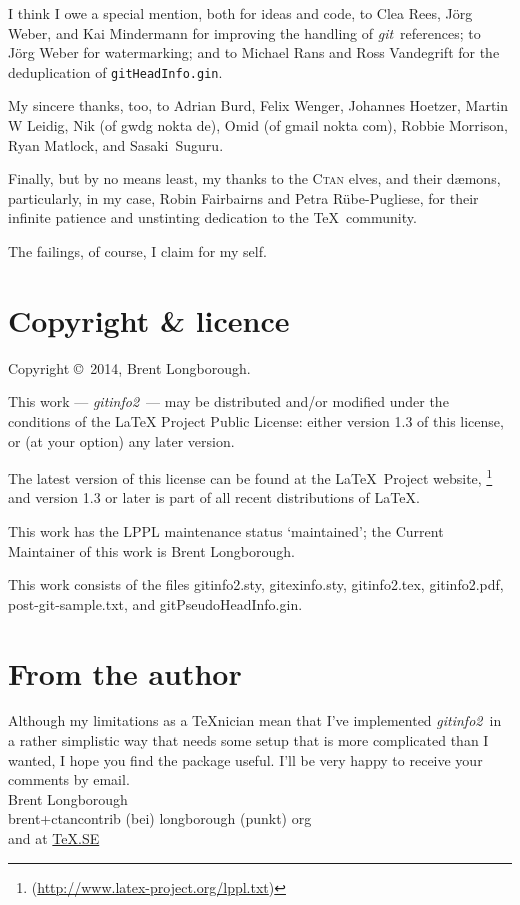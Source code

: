 \documentclass[draft,a4paper,12pt,twoside,openany]{memoir}
\newcommand{\sfit}[1]{\textit{#1}}
\newcommand{\git}{\sfit{git}}
\newcommand{\tpname}{\sfit{gitinfo2}}
\newcommand{\ginname}{gitHeadInfo.gin}
\newcommand{\metaname}{\texttt{\ginname}}
\begin{document}
I think I owe a special mention, both for ideas and code,
to Clea Rees, Jörg Weber, and Kai Mindermann
for improving the handling of \git\ references;
to Jörg Weber for watermarking;
and to Michael Rans and Ross Vandegrift for 
the deduplication of \metaname.

My sincere thanks, too, to
Adrian Burd,
Felix Wenger,
Johannes Hoetzer,
Martin W Leidig,
Nik (of gwdg nokta de),
Omid (of gmail nokta com),
Robbie Morrison,
Ryan Matlock, and
Sasaki~Suguru.

Finally, but by no means least,
my thanks to the \textsc{Ctan} elves, and their dæmons, 
particularly, in my case, 
Robin Fairbairns and Petra Rübe-Pugliese,
for their infinite patience and unstinting 
dedication to the \TeX\ community.

The failings, of course, I claim for my self.
\section{Copyright \& licence}
Copyright \copyright\ 2014, Brent Longborough.

This work --- \tpname\ --- may be distributed and/or modified under the
conditions of the LaTeX Project Public License: either version 1.3
of this license, or (at your option) any later version.

The latest version of this license can be found
at the \LaTeX\ Project website,%
\footnote{(\url{http://www.latex-project.org/lppl.txt})}
and version 1.3 or later is part of all recent distributions of 
\LaTeX.

This work has the LPPL maintenance status `maintained';
the Current Maintainer of this work is Brent Longborough.

This work consists of the files
gitinfo2.sty, gitexinfo.sty, gitinfo2.tex, gitinfo2.pdf,
post-git-sample.txt, and gitPseudoHeadInfo.gin.

\clearpage
\section{From the author}
Although my limitations as a \TeX nician
mean that I've implemented \tpname\ in a rather simplistic way
that needs some setup that is more complicated than I wanted,
I hope you find the package useful.
I'll be very happy to receive your comments by email.\\[\baselineskip]
Brent Longborough\\[\baselineskip]
\textsf{brent+ctancontrib (bei) longborough (punkt) org}\\
and at \href{http://tex.stackexchange.com/users/344/brent-longborough}{\TeX.SE}
\end{document}

